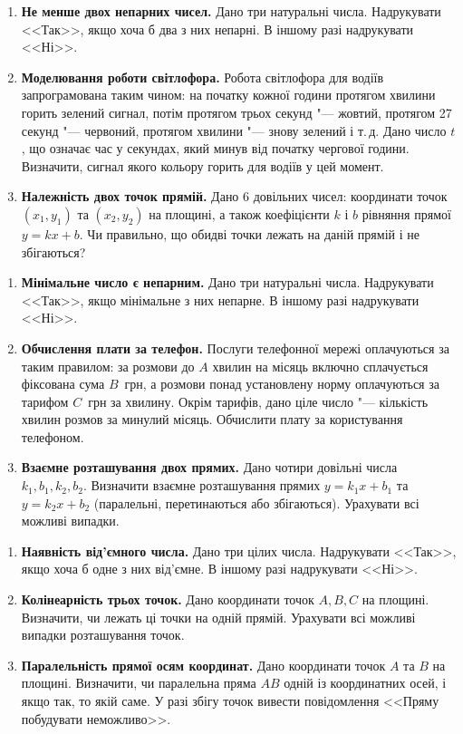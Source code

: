 	{\large
		\begin{enumerate}
			\item \textbf{Не менше двох непарних чисел.} Дано три натуральні числа. Надрукувати <<Так>>, якщо хоча б два з них непарні. В іншому разі надрукувати <<Ні>>.
			\item \textbf{Моделювання роботи світлофора.} Робота світлофора для водіїв запрограмована таким чином: на початку кожної години протягом хвилини горить зелений сигнал, потім протягом трьох секунд "--- жовтий, протягом 27 секунд "--- червоний, протягом хвилини "--- знову зелений і т.\,д. Дано число $t$, що означає час у секундах, який минув від початку чергової години. Визначити, сигнал якого кольору горить для водіїв у цей момент.
			\item \textbf{Належність двох точок прямій.} Дано 6 довільних чисел: координати точок $(x_1, y_1)$ та $(x_2, y_2)$ на площині, а також коефіцієнти $k$ і $b$ рівняння прямої $y = kx + b$. Чи правильно, що обидві точки лежать на даній прямій і не збігаються?
		\end{enumerate}
	}
	
	\vspace{2cm}
	
	
	{\large
		\begin{enumerate}
			\item \textbf{Мінімальне число є непарним.} Дано три натуральні числа. Надрукувати <<Так>>, якщо мінімальне з них непарне. В іншому разі надрукувати <<Ні>>.
			\item \textbf{Обчислення плати за телефон.} Послуги телефонної мережі оплачуються за таким правилом: за розмови до $A$ хвилин на місяць включно сплачується фіксована сума $B$~грн, а розмови понад установлену норму оплачуються за тарифом $C$~грн за хвилину. Окрім тарифів, дано ціле число "--- кількість хвилин розмов за минулий місяць. Обчислити плату за користування телефоном.
			\item \textbf{Взаємне розташування двох прямих.} Дано чотири довільні числа $k_1, b_1, k_2, b_2$. Визначити взаємне розташування прямих $y = k_1 x + b_1$ та $y = k_2 x + b_2$ (паралельні, перетинаються або збігаються). Урахувати всі можливі випадки.
		\end{enumerate}
	}
	
	
	
	
	{\large
		\begin{enumerate}
			\item \textbf{Наявність від'ємного числа.} Дано три цілих числа. Надрукувати <<Так>>, якщо хоча б одне з них від'ємне. В іншому разі надрукувати <<Ні>>.
			\item \textbf{Колінеарність трьох точок.} Дано координати точок $A, B, C$ на площині. Визначити, чи лежать ці точки на одній прямій. Урахувати всі можливі випадки розташування точок.
			\item \textbf{Паралельність прямої осям координат.} Дано координати точок $A$ та $B$ на площині. Визначити, чи паралельна пряма $AB$ одній із координатних осей, і якщо так, то якій саме. У разі збігу точок вивести повідомлення <<Пряму побудувати неможливо>>.
		\end{enumerate}
	}
	
